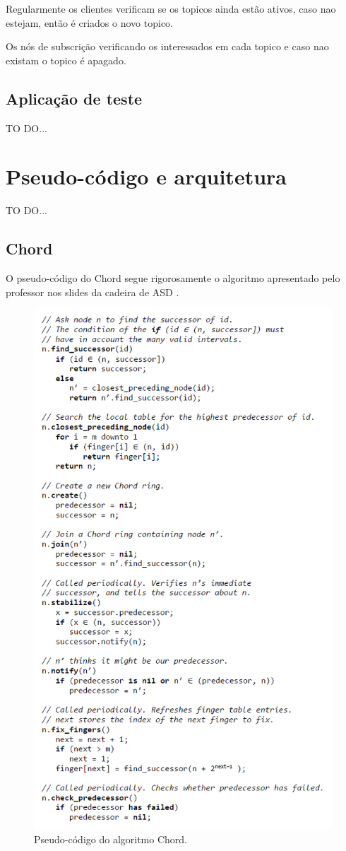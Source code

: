 \documentclass[12pt]{article}
\begin{document}
Regularmente os clientes verificam se os topicos ainda estão ativos, caso nao estejam, então é criados o novo topico.

Os nós de subscrição verificando os interessados em cada topico e caso nao existam o topico é apagado.

\newpage
\subsection{Aplicação de teste}

TO DO...

\newpage
\section{Pseudo-código e arquitetura}

TO DO...

\newpage
\subsection{Chord}

O pseudo-código do Chord segue rigorosamente o algoritmo apresentado pelo professor nos slides da cadeira de ASD \cite{b1}.

\begin{figure}[htbp]
	\centering
	\includegraphics[height=0.96\textwidth]{pseudoChord.png}
	\caption{Pseudo-código do algoritmo Chord.}
	\label{fig:chord}
\end{figure}
\end{document}
